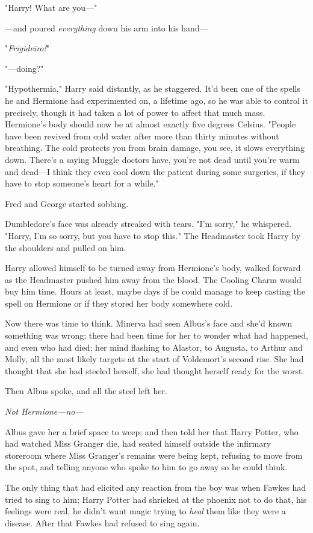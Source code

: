 "Harry! What are you---"

---and poured \emph{everything} down his arm into his hand---

"\emph{Frigideiro!}"

"---doing?"

"Hypothermia," Harry said distantly, as he staggered. It'd been one of the
spells he and Hermione had experimented on, a lifetime ago, so he was able to
control it precisely, though it had taken a lot of power to affect that much
mass. Hermione's body should now be at almost exactly five degrees Celsius.
"People have been revived from cold water after more than thirty minutes
without breathing. The cold protects you from brain damage, you see, it slows
everything down. There's a saying Muggle doctors have, you're not dead until
you're warm and dead---I think they even cool down the patient during some
surgeries, if they have to stop someone's heart for a while."

Fred and George started sobbing.

Dumbledore's face was already streaked with tears. "I'm sorry," he whispered.
"Harry, I'm so sorry, but you have to stop this." The Headmaster took Harry by
the shoulders and pulled on him.

Harry allowed himself to be turned away from Hermione's body, walked forward as
the Headmaster pushed him away from the blood. The Cooling Charm would buy him
time. Hours at least, maybe days if he could manage to keep casting the spell
on Hermione or if they stored her body somewhere cold.

Now there was time to think.
\later
Minerva had seen Albus's face and she'd known something was wrong; there had
been time for her to wonder what had happened, and even who had died; her mind
flashing to Alastor, to Augusta, to Arthur and Molly, all the most likely
targets at the start of Voldemort's second rise. She had thought that she had
steeled herself, she had thought herself ready for the worst.

Then Albus spoke, and all the steel left her.

\emph{Not Hermione---no---}

Albus gave her a brief space to weep; and then told her that Harry Potter, who
had watched Miss Granger die, had seated himself outside the infirmary
storeroom where Miss Granger's remains were being kept, refusing to move from
the spot, and telling anyone who spoke to him to go away so he could think.

The only thing that had elicited any reaction from the boy was when Fawkes had
tried to sing to him; Harry Potter had shrieked at the phoenix not to do that,
his feelings were real, he didn't want magic trying to \emph{heal} them like
they were a disease. After that Fawkes had refused to sing again.

